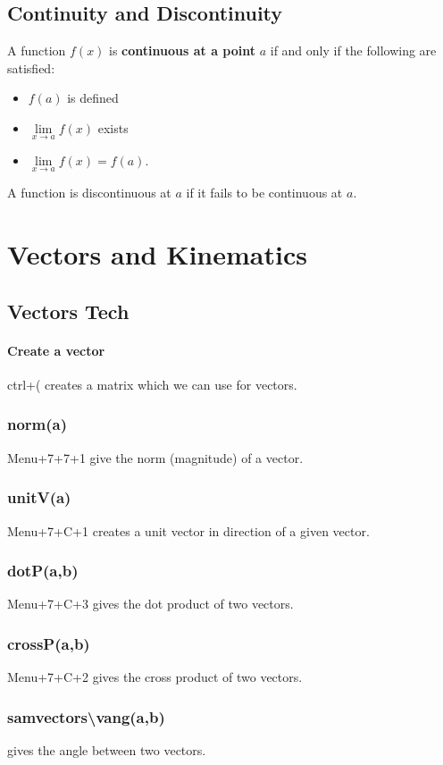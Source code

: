\documentclass[a4paper,twoside,10pt]{article}
\begin{document}
		\subsection{Continuity and Discontinuity}
			A function $f(x)$ is \textbf{continuous at a point} $a$ if and only if the following are satisfied:\\
			\begin{itemize}
				\item $f(a)$ is defined
				\item $\lim\limits_{x\to a}f(x)$ exists
				\item $\lim\limits_{x\to a}f(x)=f(a)$.
			\end{itemize}
			A function is discontinuous at $a$ if it fails to be continuous at $a$.
	\section{Vectors and Kinematics}
		\subsection{Vectors Tech}
			\paragraph{Create a vector} ctrl+( creates a matrix which we can use for vectors.
			\subsubsection{norm(a)} Menu+7+7+1 give the norm (magnitude) of a vector.
			\subsubsection{unitV(a)} Menu+7+C+1 creates a unit vector in direction of a given vector.
			\subsubsection{dotP(a,b)} Menu+7+C+3 gives the dot product of two vectors.
			\subsubsection{crossP(a,b)} Menu+7+C+2 gives the cross product of two vectors.
			\subsubsection{sam\textunderscore vectors\textbackslash vang(a,b)} gives the angle between two vectors.
\end{document}
